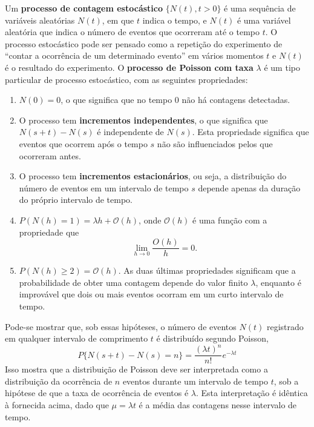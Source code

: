 Um \textbf{processo de contagem estocástico} $\{N(t), t > 0\}$ é uma sequência de variáveis aleatórias $N(t)$, em que $t$ indica o tempo, e $N(t)$ é uma variável aleatória que indica o número de eventos que ocorreram até o tempo $t$. O processo estocástico pode ser pensado como a repetição do experimento de ``contar a ocorrência de um determinado evento'' em vários momentos $t$ e $N(t)$ é o resultado do experimento. O \textbf{processo de Poisson com taxa} $\lambda$ é um tipo particular de processo estocástico, com as seguintes propriedades:

\begin{enumerate}[noitemsep]
\item  $N(0) = 0$, o que significa que no tempo $0$ não há contagens detectadas.
\item O processo tem \textbf{incrementos independentes}, o que significa que $N(s + t) - N(s)$ é independente de $N(s)$. Esta propriedade significa que eventos que ocorrem após o tempo $s$ não são influenciados pelos que ocorreram antes.
\item O processo tem \textbf{incrementos estacionários}, ou seja, a distribuição do número de eventos em um intervalo de tempo $s$ depende apenas da duração do próprio intervalo de tempo.
\item $P(N(h) = 1) = \lambda h + \mathcal{O}(h)$, onde $\mathcal{O}(h)$ é uma função com a propriedade que
\begin{equation*}
\lim_{h \to 0} \dfrac{O(h)}{h} = 0.
\end{equation*}
\item $P(N(h) \geq 2) = \mathcal{O}(h)$. As duas últimas propriedades significam que a probabilidade de obter uma contagem depende do valor finito $\lambda$, enquanto é improvável que dois ou mais eventos ocorram em um curto intervalo de tempo.
\end{enumerate}
Pode-se mostrar que, sob essas hipóteses, o número de eventos $N(t)$ registrado em qualquer intervalo de comprimento $t$ é distribuído segundo Poisson,
\begin{equation}
P\{N(s + t) - N(s) = n\} = \dfrac{(\lambda t)^n }{n!}e^{-\lambda t}
\end{equation}
Isso mostra que a distribuição de Poisson deve ser interpretada como a distribuição da ocorrência de $n$ eventos durante um intervalo de tempo $t$, sob a hipótese de que a taxa de ocorrência de eventos é $\lambda$. Esta interpretação é idêntica à fornecida acima, dado que $\mu = \lambda t$ é a média das contagens nesse intervalo de tempo.

